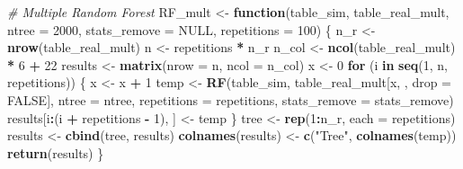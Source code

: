 \documentclass[]{book}
\newenvironment{Shaded}{\begin{snugshade}}{\end{snugshade}}
\newcommand{\KeywordTok}[1]{\textcolor[rgb]{0.13,0.29,0.53}{\textbf{{#1}}}}
\newcommand{\DataTypeTok}[1]{\textcolor[rgb]{0.13,0.29,0.53}{{#1}}}
\newcommand{\DecValTok}[1]{\textcolor[rgb]{0.00,0.00,0.81}{{#1}}}
\newcommand{\StringTok}[1]{\textcolor[rgb]{0.31,0.60,0.02}{{#1}}}
\newcommand{\CommentTok}[1]{\textcolor[rgb]{0.56,0.35,0.01}{\textit{{#1}}}}
\newcommand{\OtherTok}[1]{\textcolor[rgb]{0.56,0.35,0.01}{{#1}}}
\newcommand{\ControlFlowTok}[1]{\textcolor[rgb]{0.13,0.29,0.53}{\textbf{{#1}}}}
\newcommand{\OperatorTok}[1]{\textcolor[rgb]{0.81,0.36,0.00}{\textbf{{#1}}}}
\newcommand{\NormalTok}[1]{{#1}}
\theoremstyle{definition}
\theoremstyle{definition}
\theoremstyle{definition}
\theoremstyle{remark}
\begin{document}
\begin{Shaded}
\begin{Highlighting}[]
\CommentTok{# Multiple Random Forest}
\NormalTok{RF_mult <-}\StringTok{ }\ControlFlowTok{function}\NormalTok{(table_sim, table_real_mult, }\DataTypeTok{ntree =} \DecValTok{2000}\NormalTok{, }
                   \DataTypeTok{stats_remove =} \OtherTok{NULL}\NormalTok{, }\DataTypeTok{repetitions =} \DecValTok{100}\NormalTok{) \{}
\NormalTok{ n_r <-}\StringTok{ }\KeywordTok{nrow}\NormalTok{(table_real_mult)}
\NormalTok{ n <-}\StringTok{ }\NormalTok{repetitions }\OperatorTok{*}\StringTok{ }\NormalTok{n_r}
\NormalTok{ n_col <-}\StringTok{ }\KeywordTok{ncol}\NormalTok{(table_real_mult) }\OperatorTok{*}\StringTok{ }\DecValTok{6} \OperatorTok{+}\StringTok{ }\DecValTok{22}
\NormalTok{ results <-}\StringTok{ }\KeywordTok{matrix}\NormalTok{(}\DataTypeTok{nrow =}\NormalTok{ n, }\DataTypeTok{ncol =}\NormalTok{ n_col)}
\NormalTok{ x <-}\StringTok{ }\DecValTok{0}
 \ControlFlowTok{for}\NormalTok{ (i }\ControlFlowTok{in} \KeywordTok{seq}\NormalTok{(}\DecValTok{1}\NormalTok{, n, repetitions)) \{}
\NormalTok{   x <-}\StringTok{ }\NormalTok{x }\OperatorTok{+}\StringTok{ }\DecValTok{1}
\NormalTok{   temp <-}\StringTok{ }\KeywordTok{RF}\NormalTok{(table_sim, }
\NormalTok{              table_real_mult[x, , }\DataTypeTok{drop =} \OtherTok{FALSE}\NormalTok{],}
              \DataTypeTok{ntree =}\NormalTok{ ntree, }
              \DataTypeTok{repetitions =}\NormalTok{ repetitions, }
              \DataTypeTok{stats_remove =}\NormalTok{ stats_remove)}
\NormalTok{   results[i}\OperatorTok{:}\NormalTok{(i }\OperatorTok{+}\StringTok{ }\NormalTok{repetitions }\OperatorTok{-}\StringTok{ }\DecValTok{1}\NormalTok{), ] <-}\StringTok{ }\NormalTok{temp}
\NormalTok{ \}}
\NormalTok{ tree <-}\StringTok{ }\KeywordTok{rep}\NormalTok{(}\DecValTok{1}\OperatorTok{:}\NormalTok{n_r, }\DataTypeTok{each =}\NormalTok{ repetitions)}
\NormalTok{ results <-}\StringTok{ }\KeywordTok{cbind}\NormalTok{(tree, results)}
 \KeywordTok{colnames}\NormalTok{(results) <-}\StringTok{ }\KeywordTok{c}\NormalTok{(}\StringTok{"Tree"}\NormalTok{, }\KeywordTok{colnames}\NormalTok{(temp))}
 \KeywordTok{return}\NormalTok{(results)}
\NormalTok{\}}


\end{Highlighting}
\end{Shaded}
\end{document}
